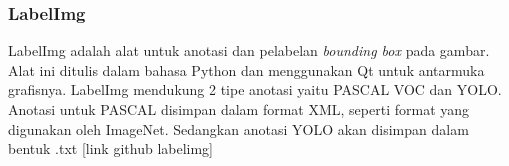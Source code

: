 \documentclass[../thesis.tex]{subfiles}
\begin{document}
\subsubsection{LabelImg}
LabelImg adalah alat untuk anotasi dan pelabelan \textit{bounding box} pada gambar. Alat ini ditulis dalam bahasa Python dan menggunakan Qt untuk antarmuka grafisnya. LabelImg mendukung 2 tipe anotasi yaitu PASCAL VOC dan YOLO. 
Anotasi untuk PASCAL disimpan dalam format XML, seperti format yang digunakan oleh ImageNet. Sedangkan anotasi YOLO akan disimpan dalam bentuk .txt [link github labelimg]
\end{document}
